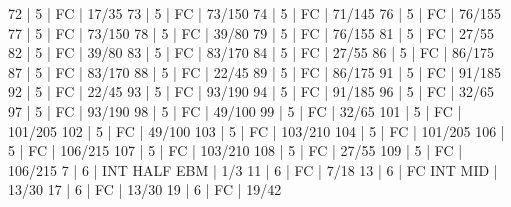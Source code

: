 72    |  5     |    FC                                        | 17/35   
73    |  5     |    FC                                        | 73/150   
74    |  5     |    FC                                        | 71/145   
76    |  5     |    FC                                        | 76/155   
77    |  5     |    FC                                        | 73/150   
78    |  5     |    FC                                        | 39/80   
79    |  5     |    FC                                        | 76/155   
81    |  5     |    FC                                        | 27/55   
82    |  5     |    FC                                        | 39/80   
83    |  5     |    FC                                        | 83/170   
84    |  5     |    FC                                        | 27/55   
86    |  5     |    FC                                        | 86/175   
87    |  5     |    FC                                        | 83/170   
88    |  5     |    FC                                        | 22/45   
89    |  5     |    FC                                        | 86/175   
91    |  5     |    FC                                        | 91/185   
92    |  5     |    FC                                        | 22/45   
93    |  5     |    FC                                        | 93/190   
94    |  5     |    FC                                        | 91/185   
96    |  5     |    FC                                        | 32/65   
97    |  5     |    FC                                        | 93/190   
98    |  5     |    FC                                        | 49/100   
99    |  5     |    FC                                        | 32/65   
101   |  5     |    FC                                        | 101/205   
102   |  5     |    FC                                        | 49/100   
103   |  5     |    FC                                        | 103/210   
104   |  5     |    FC                                        | 101/205   
106   |  5     |    FC                                        | 106/215   
107   |  5     |    FC                                        | 103/210   
108   |  5     |    FC                                        | 27/55   
109   |  5     |    FC                                        | 106/215   
7     |  6     |        INT  HALF  EBM                        | 1/3   
11    |  6     |    FC                                        | 7/18   
13    |  6     |    FC  INT                  MID              | 13/30   
17    |  6     |    FC                                        | 13/30   
19    |  6     |    FC                                        | 19/42   
